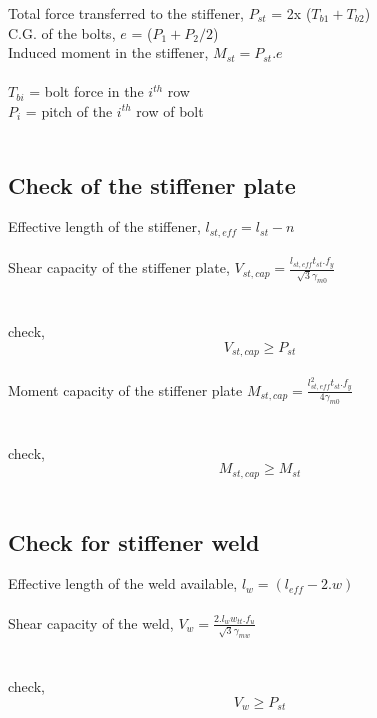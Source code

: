 \documentclass[11.5pt,a4paper,oneside]{report}
\begin{document}
\begin{Form}
\noindent
Total force transferred to the stiffener, $P_{st}$ = 2x ($T_{b1} + T_{b2}$)\\
C.G. of the bolts, $e$ = ($P_1 + P_2/2$)\\
Induced moment in the stiffener, $M_{st} = P_{st}.e$\\
\\
\indent $T_{bi}$ = bolt force in the $i^{th}$ row \\
\indent $P_i$ = pitch of the $i^{th}$ row of bolt\\
\\
\subsection{Check of the stiffener plate}
Effective length of the stiffener, $l_{st,eff} = l_{st} - n$\\
\\
Shear capacity of the stiffener plate, $V_{st,cap} = \frac{l_{st,eff} t_{st} . f_y}{\sqrt{3} \gamma_{m0}}$\\
\indent [Reference: Cl. 8.4.1 of IS 800: 2007] \\ 
\\
check,
\begin{equation}
V_{st,cap} \ge P_{st}
\end{equation}
\\
Moment capacity of the stiffener plate $M_{st,cap} = \frac{l_{st,eff}^2 t_{st} . f_y}{4 \gamma_{m0}}$\\
\indent [Reference: Cl. 8.2.1.2 of IS 800: 2007] \\ 
\\
check,
\begin{equation}
M_{st,cap} \ge M_{st}
\end{equation}
\\

\subsection{Check for stiffener weld}
Effective length of the weld available, $l_w = (l_{eff} - 2.w)$\\
\\
Shear capacity of the weld, $V_w = \frac{2. l_w w_{tt} . f_u}{\sqrt{3} \gamma_{mw}}$\\
\indent [Reference: Cl. 10.5.7 of IS 800: 2007] \\ 
\\
check,
\begin{equation}
V_{w} \ge P_{st}
\end{equation}
\\

\end{Form}
\end{document}
